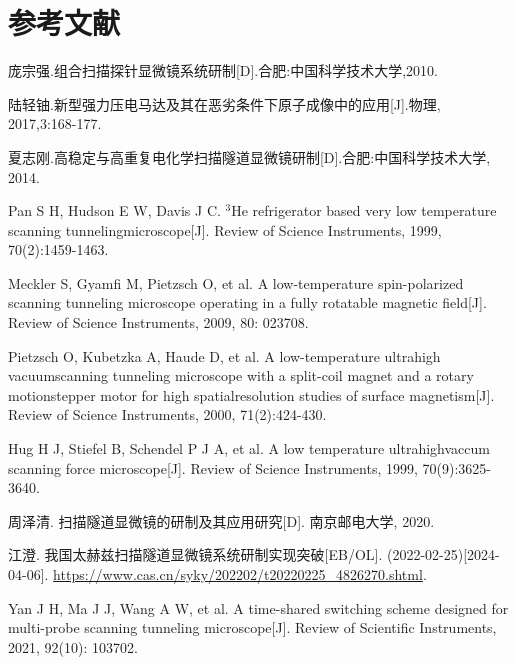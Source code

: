 \documentclass[zihao=-4]{ctexart}
\begin{document}
\section*{参考文献} %
\begingroup  %
\renewcommand{\section}[2]{} 
\begin{thebibliography}{25}
	
	 庞宗强.组合扫描探针显微镜系统研制[D].合肥:中国科学技术大学,2010.
	
	 陆轻铀.新型强力压电马达及其在恶劣条件下原子成像中的应用[J].物理, 2017,3:168-177.
	
	 夏志刚.高稳定与高重复电化学扫描隧道显微镜研制[D].合肥:中国科学技术大学, 2014.
	
	 Pan S H, Hudson E W, Davis J C. $^\text{3}$He refrigerator based very low temperature scanning tunnelingmicroscope[J]. Review of Science Instruments, 1999, 70(2):1459-1463.
	
	 Meckler S, Gyamfi M, Pietzsch O, et al. A low-temperature spin-polarized scanning tunneling microscope operating in a fully rotatable magnetic field[J]. Review of Science Instruments, 2009, 80: 023708.
	
	 Pietzsch O, Kubetzka A, Haude D, et al. A low-temperature ultrahigh vacuumscanning tunneling microscope with a split-coil magnet and a rotary motionstepper motor for high spatialresolution studies of surface magnetism[J]. Review of Science Instruments, 2000, 71(2):424-430.
	
	Hug H J, Stiefel B, Schendel P J A, et al. A low temperature ultrahighvaccum scanning force microscope[J]. Review of Science Instruments, 1999, 70(9):3625-3640.
	
	 周泽清. 扫描隧道显微镜的研制及其应用研究[D]. 南京邮电大学, 2020.
	
	 江澄. 我国太赫兹扫描隧道显微镜系统研制实现突破[EB/OL]. (2022-02-25)[2024-04-06]. \href{https://www.cas.cn/syky/202202/t20220225\_4826270.shtml}{https://www.cas.cn/syky/202202/t20220225\_4826270.shtml}.
	
	 Yan J H, Ma J J, Wang A W, et al. A time-shared switching scheme designed for multi-probe scanning tunneling microscope[J]. Review of Scientific Instruments, 2021, 92(10): 103702.
	

\end{thebibliography}
\end{document}
